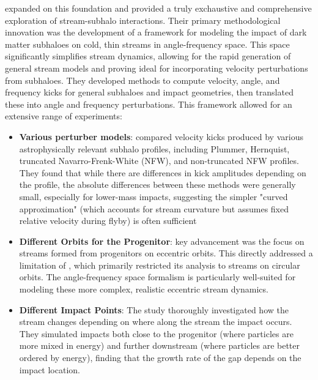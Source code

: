             \citet{2016MNRAS.457.3817S} expanded on this foundation and provided a truly exchaustive and comprehensive exploration of stream-subhalo interactions. Their primary methodological innovation was the development of a framework for modeling the impact of dark matter subhaloes on cold, thin streams in angle-frequency space. This space significantly simplifies stream dynamics, allowing for the rapid generation of general stream models and proving ideal for incorporating velocity perturbations from subhaloes. They developed methods to compute velocity, angle, and frequency kicks for general subhaloes and impact geometries, then translated these into angle and frequency perturbations. This framework allowed for an extensive range of experiments:

            \begin{itemize}
                \item \textbf{Various perturber models}: \citet{2016MNRAS.457.3817S} compared velocity kicks produced by various astrophysically relevant subhalo profiles, including Plummer, Hernquist, truncated Navarro-Frenk-White (NFW), and non-truncated NFW profiles. They found that while there are differences in kick amplitudes depending on the profile, the absolute differences between these methods were generally small, especially for lower-mass impacts, suggesting the simpler "curved approximation" (which accounts for stream curvature but assumes fixed relative velocity during flyby) is often sufficient
                \item \textbf{Different Orbits for the Progenitor}: key advancement was the focus on streams formed from progenitors on eccentric orbits. This directly addressed a limitation of \citet{2015MNRAS.450.1136E}, which primarily restricted its analysis to streams on circular orbits. The angle-frequency space formalism is particularly well-suited for modeling these more complex, realistic eccentric stream dynamics.
                \item \textbf{Different Impact Points}: The study thoroughly investigated how the stream changes depending on where along the stream the impact occurs. They simulated impacts both close to the progenitor (where particles are more mixed in energy) and further downstream (where particles are better ordered by energy), finding that the growth rate of the gap depends on the impact location. 
            \end{itemize}

